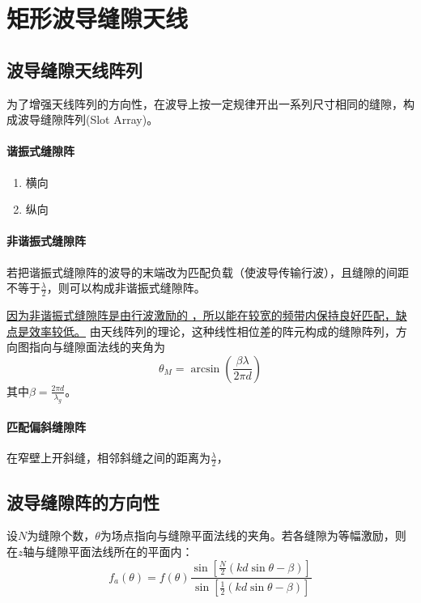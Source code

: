 \section{矩形波导缝隙天线}
    
    
    \subsection{波导缝隙天线阵列}
    为了增强天线阵列的方向性，在波导上按一定规律开出一系列尺寸相同的缝隙，构成波导缝隙阵列(Slot Array)。

    \paragraph{谐振式缝隙阵}
    \begin{enumerate}
    \renewcommand*\labelenumi{\circled{\theenumi}}
        \item 横向
        \item 纵向
    \end{enumerate} 

    \paragraph{非谐振式缝隙阵}
    若把谐振式缝隙阵的波导的末端改为匹配负载（使波导传输行波），且缝隙的间距不等于$\frac{\lambda}{2}$，则可以构成非谐振式缝隙阵。

    \underline{因为非谐振式缝隙阵是由行波激励的 ，所以能在较宽的频带内保持良好匹配，缺点是效率较低。}
    由天线阵列的理论，这种线性相位差的阵元构成的缝隙阵列，方向图指向与缝隙面法线的夹角为
    \begin{equation}
        \theta_M=\arcsin\left(\frac{\beta \lambda}{2 \pi d}\right)
    \end{equation}
    其中$\beta=\frac{2 \pi d}{\lambda_g}$。


    \paragraph{匹配偏斜缝隙阵}
    在窄壁上开斜缝，相邻斜缝之间的距离为$\frac{\lambda}{2}$，




    \subsection{波导缝隙阵的方向性}
    设$N$为缝隙个数，$\theta$为场点指向与缝隙平面法线的夹角。若各缝隙为等幅激励，则在$z$轴与缝隙平面法线所在的平面内：
    \begin{equation}
        f_a(\theta)=f(\theta)\frac{\sin\left[\frac{N}{2}(kd\sin\theta-\beta)\right]}{\sin\left[\frac{1}{2}(kd\sin\theta-\beta)\right]}
    \end{equation}



